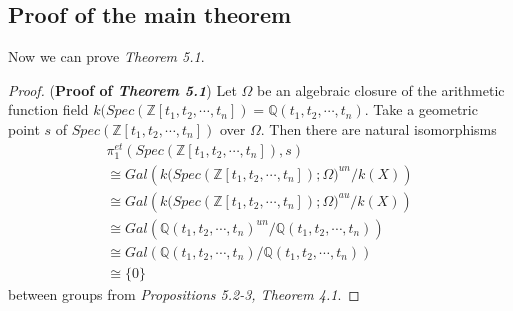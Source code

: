 \documentclass{amsart}
\theoremstyle{definition}
\numberwithin{equation}{section}
\begin{document}
\subsection{Proof of the main theorem}

Now we can prove \emph{Theorem 5.1}.

\begin{proof}
(\textbf{Proof of \emph{Theorem 5.1}}) Let $\Omega$ be an algebraic closure  of the arithmetic function field $k( Spec(\mathbb{Z}[t_{1},t_{2},\cdots,t_{n}])=\mathbb{Q}(t_{1},t_{2},\cdots,t_{n})$. Take a geometric point $s$ of $Spec(\mathbb{Z}[t_{1},t_{2},\cdots,t_{n}])$ over $\Omega$.
Then there are natural isomorphisms
\begin{equation*}
\begin{array}{l}
\pi _{1}^{et}\left( Spec(\mathbb{Z}[t_{1},t_{2},\cdots,t_{n}]),s\right)\\

\cong Gal\left( {k( Spec(\mathbb{Z}[t_{1},t_{2},\cdots,t_{n}]); \Omega})^{un}/k\left(
X\right) \right)\\

\cong Gal\left( {k( Spec(\mathbb{Z}[t_{1},t_{2},\cdots,t_{n}]); \Omega})^{au}/k\left(
X\right) \right)\\

\cong Gal\left( {\mathbb{Q}(t_{1},t_{2},\cdots,t_{n})}^{un}/{\mathbb{Q}(t_{1},t_{2},\cdots,t_{n})} \right)\\

\cong Gal\left( {\mathbb{Q}(t_{1},t_{2},\cdots,t_{n})}/{\mathbb{Q}(t_{1},t_{2},\cdots,t_{n})} \right)\\

\cong \{0\}
\end{array}
\end{equation*}
between groups
from \emph{Propositions 5.2-3, Theorem 4.1}.
\end{proof}

\newpage
\end{document}
